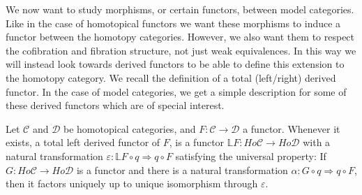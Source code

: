 \documentclass[../thesis.tex]{subfiles}
\begin{document}
            We now want to study morphisms, or certain functors, between model categories. Like in the case of homotopical functors we want these morphisms to induce a functor between the homotopy categories. However, we also want them to respect the cofibration and fibration structure, not just weak equivalences. In this way we will instead look towards derived functors to be able to define this extension to the homotopy category. We recall the definition of a total (left/right) derived functor. In the case of model categories, we get a simple description for some of these derived functors which are of special interest.

            \begin{definition}
                Let $\mathcal{C}$ and $\mathcal{D}$ be homotopical categories, and $F:\mathcal{C}\rightarrow\mathcal{D}$ a functor. Whenever it exists, a total left derived functor of $F$, is a functor $\mathbb{L}F:Ho\mathcal{C}\rightarrow Ho\mathcal{D}$ with a natural transformation $\varepsilon :\mathbb{L}F\circ q \Rightarrow q\circ F$ satisfying the universal property: If $G:Ho\mathcal{C}\rightarrow Ho\mathcal{D}$ is a functor and there is a natural transformation $\alpha :G\circ q \Rightarrow q\circ F$, then it factors uniquely up to unique isomorphism through $\varepsilon$.
                \begin{center}
                    \qquad
                \end{center}


\end{definition}
\end{document}
